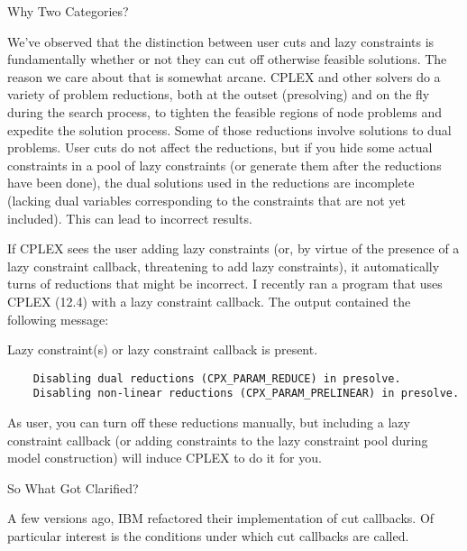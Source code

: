 {Why Two Categories?

We've observed that the distinction between user cuts and lazy constraints is fundamentally whether or not they can cut off otherwise feasible solutions. The reason we care about that is somewhat arcane. CPLEX and other solvers do a variety of problem reductions, both at the outset (presolving) and on the fly during the search process, to tighten the feasible regions of node problems and expedite the solution process. Some of those reductions involve solutions to dual problems. User cuts do not affect the reductions, but if you hide some actual constraints in a pool of lazy constraints (or generate them after the reductions have been done), the dual solutions used in the reductions are incomplete (lacking dual variables corresponding to the constraints that are not yet included). This can lead to incorrect results.

If CPLEX sees the user adding lazy constraints (or, by virtue of the presence of a lazy constraint callback, threatening to add lazy constraints), it automatically turns of reductions that might be incorrect. I recently ran a program that uses CPLEX (12.4) with a lazy constraint callback. The output contained the following message:

Lazy constraint(s) or lazy constraint callback is present.
\begin{verbatim}
    Disabling dual reductions (CPX_PARAM_REDUCE) in presolve.
    Disabling non-linear reductions (CPX_PARAM_PRELINEAR) in presolve.
\end{verbatim}

As user, you can turn off these reductions manually, but including a lazy constraint callback (or adding constraints to the lazy constraint pool during model construction) will induce CPLEX to do it for you.

So What Got Clarified?

A few versions ago, IBM refactored their implementation of cut callbacks. Of particular interest is the conditions under which cut callbacks are called.

}
